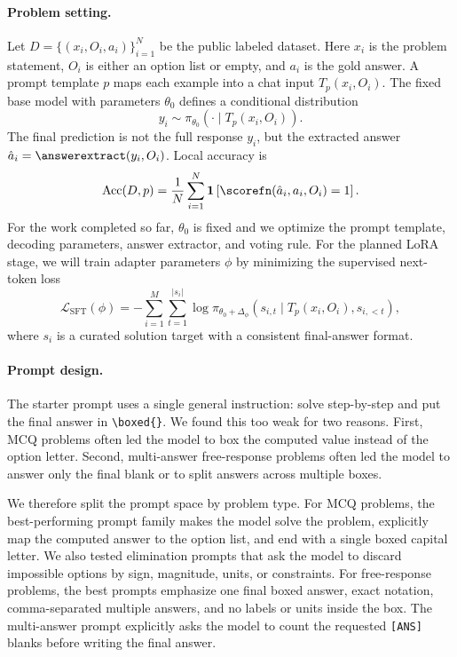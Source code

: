 \documentclass{article}
\begin{document}
\paragraph{Problem setting.}
Let $D = \{(x_i, O_i, a_i)\}_{i=1}^{N}$ be the public labeled dataset. Here $x_i$ is the problem statement, $O_i$ is either an option list or empty, and $a_i$ is the gold answer. A prompt template $p$ maps each example into a chat input $T_p(x_i, O_i)$. The fixed base model with parameters $\theta_0$ defines a conditional distribution
\begin{equation}
  y_i \sim \pi_{\theta_0}(\cdot \mid T_p(x_i, O_i)).
\end{equation}
The final prediction is not the full response $y_i$, but the extracted answer $\hat{a}_i = \answerextract(y_i, O_i)$. Local accuracy is
\begin{equation}
  \mathrm{Acc}(D,p) =
  \frac{1}{N}\sum_{i=1}^{N}
  \mathbf{1}\left[\scorefn(\hat{a}_i, a_i, O_i)=1\right].
\end{equation}
For the work completed so far, $\theta_0$ is fixed and we optimize the prompt template, decoding parameters, answer extractor, and voting rule. For the planned LoRA stage, we will train adapter parameters $\phi$ by minimizing the supervised next-token loss
\begin{equation}
  \mathcal{L}_{\mathrm{SFT}}(\phi) =
  -\sum_{i=1}^{M}\sum_{t=1}^{|s_i|}
  \log \pi_{\theta_0+\Delta_{\phi}}
  \left(s_{i,t}\mid T_p(x_i,O_i), s_{i,<t}\right),
\end{equation}
where $s_i$ is a curated solution target with a consistent final-answer format.

\paragraph{Prompt design.}
The starter prompt uses a single general instruction: solve step-by-step and put the final answer in \verb|\boxed{}|. We found this too weak for two reasons. First, MCQ problems often led the model to box the computed value instead of the option letter. Second, multi-answer free-response problems often led the model to answer only the final blank or to split answers across multiple boxes.

We therefore split the prompt space by problem type. For MCQ problems, the best-performing prompt family makes the model solve the problem, explicitly map the computed answer to the option list, and end with a single boxed capital letter. We also tested elimination prompts that ask the model to discard impossible options by sign, magnitude, units, or constraints. For free-response problems, the best prompts emphasize one final boxed answer, exact notation, comma-separated multiple answers, and no labels or units inside the box. The multi-answer prompt explicitly asks the model to count the requested \texttt{[ANS]} blanks before writing the final answer.
\end{document}
